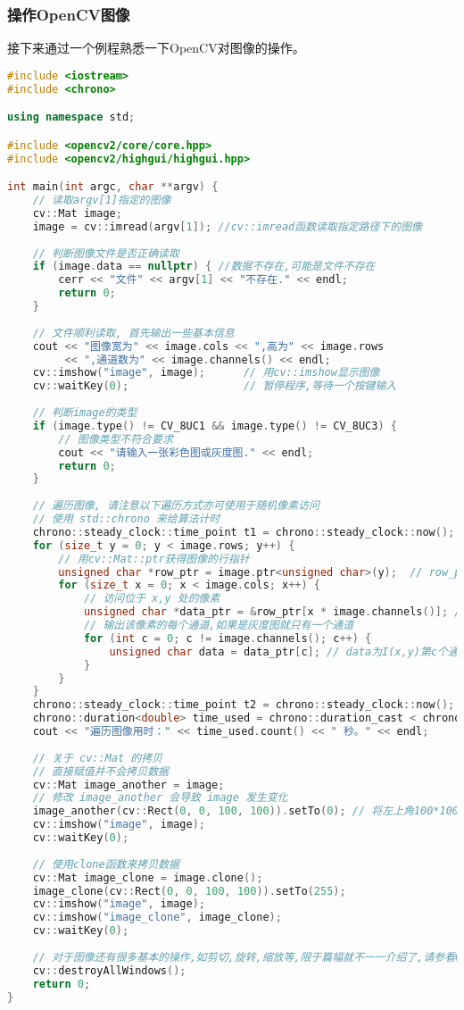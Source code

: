 \subsubsection{操作OpenCV图像}
接下来通过一个例程熟悉一下OpenCV对图像的操作。
\begin{lstlisting}[language=C++,caption=slambook/ch5/imageBasics/imageBasics.cpp]
#include <iostream>
#include <chrono>

using namespace std;

#include <opencv2/core/core.hpp>
#include <opencv2/highgui/highgui.hpp>

int main(int argc, char **argv) {
	// 读取argv[1]指定的图像
	cv::Mat image;
	image = cv::imread(argv[1]); //cv::imread函数读取指定路径下的图像
	
	// 判断图像文件是否正确读取
	if (image.data == nullptr) { //数据不存在,可能是文件不存在
		cerr << "文件" << argv[1] << "不存在." << endl;
		return 0;
	}
	
	// 文件顺利读取, 首先输出一些基本信息
	cout << "图像宽为" << image.cols << ",高为" << image.rows 
	     << ",通道数为" << image.channels() << endl;
	cv::imshow("image", image);      // 用cv::imshow显示图像
	cv::waitKey(0);                  // 暂停程序,等待一个按键输入
	
	// 判断image的类型
	if (image.type() != CV_8UC1 && image.type() != CV_8UC3) {
		// 图像类型不符合要求
		cout << "请输入一张彩色图或灰度图." << endl;
		return 0;
	}
	
	// 遍历图像, 请注意以下遍历方式亦可使用于随机像素访问
	// 使用 std::chrono 来给算法计时
	chrono::steady_clock::time_point t1 = chrono::steady_clock::now();
	for (size_t y = 0; y < image.rows; y++) {
		// 用cv::Mat::ptr获得图像的行指针
		unsigned char *row_ptr = image.ptr<unsigned char>(y);  // row_ptr是第y行的头指针
		for (size_t x = 0; x < image.cols; x++) {
			// 访问位于 x,y 处的像素
			unsigned char *data_ptr = &row_ptr[x * image.channels()]; // data_ptr 指向待访问的像素数据
			// 输出该像素的每个通道,如果是灰度图就只有一个通道
			for (int c = 0; c != image.channels(); c++) {
				unsigned char data = data_ptr[c]; // data为I(x,y)第c个通道的值
			}
		}
	}
	chrono::steady_clock::time_point t2 = chrono::steady_clock::now();
	chrono::duration<double> time_used = chrono::duration_cast < chrono::duration < double >> (t2 - t1);
	cout << "遍历图像用时：" << time_used.count() << " 秒。" << endl;
	
	// 关于 cv::Mat 的拷贝
	// 直接赋值并不会拷贝数据
	cv::Mat image_another = image;
	// 修改 image_another 会导致 image 发生变化
	image_another(cv::Rect(0, 0, 100, 100)).setTo(0); // 将左上角100*100的块置零
	cv::imshow("image", image);
	cv::waitKey(0);
	
	// 使用clone函数来拷贝数据
	cv::Mat image_clone = image.clone();
	image_clone(cv::Rect(0, 0, 100, 100)).setTo(255);
	cv::imshow("image", image);
	cv::imshow("image_clone", image_clone);
	cv::waitKey(0);
	
	// 对于图像还有很多基本的操作,如剪切,旋转,缩放等,限于篇幅就不一一介绍了,请参看OpenCV官方文档查询每个函数的调用方法.
	cv::destroyAllWindows();
	return 0;
}
\end{lstlisting}
	
